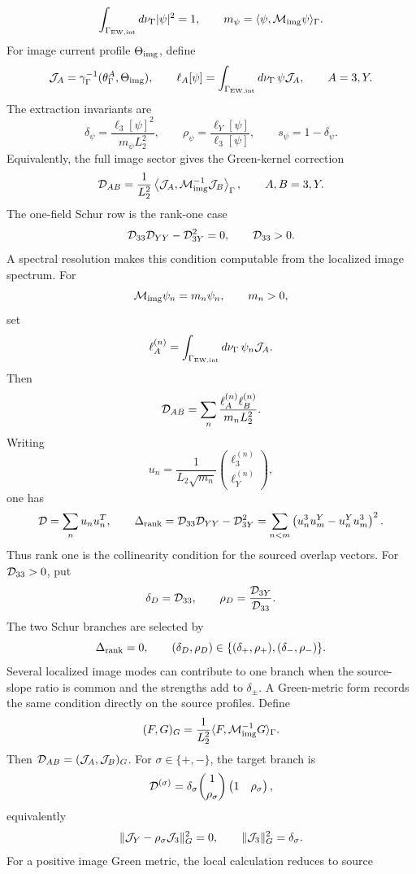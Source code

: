 \documentclass[11pt]{article}
\theoremstyle{definition}
\theoremstyle{remark}
\begin{document}
\[
  \int_{\Gamma_{\rm EW,int}}d\nu_\Gamma|\psi|^2=1,\qquad
  m_\psi=\langle\psi,{\cal M}_{\rm img}\psi\rangle_\Gamma .
\]
For image current profile \(\Theta_{\rm img}\), define
\[
  {\cal J}_A=\gamma_\Gamma^{-1}(\theta_\Gamma^A,\Theta_{\rm img}),
  \qquad
  \ell_A[\psi]=
  \int_{\Gamma_{\rm EW,int}}d\nu_\Gamma\,\psi{\cal J}_A,
  \qquad A=3,Y .
\]
The extraction invariants are
\[
  \delta_\psi=\frac{\ell_3[\psi]^2}{m_\psi L_2^2},
  \qquad
  \rho_\psi=\frac{\ell_Y[\psi]}{\ell_3[\psi]},
  \qquad
  s_\psi=1-\delta_\psi .
\]
Equivalently, the full image sector gives the Green-kernel correction
\[
  {\cal D}_{AB}
  =
  \frac{1}{L_2^2}
  \left\langle
  {\cal J}_A,
  {\cal M}_{\rm img}^{-1}{\cal J}_B
  \right\rangle_\Gamma,
  \qquad A,B=3,Y .
\]
The one-field Schur row is the rank-one case
\[
  {\cal D}_{33}{\cal D}_{YY}-{\cal D}_{3Y}^2=0,
  \qquad
  {\cal D}_{33}>0 .
\]
A spectral resolution makes this condition computable from the localized
image spectrum.  For
\[
  {\cal M}_{\rm img}\psi_n=m_n\psi_n,
  \qquad m_n>0,
\]
set
\[
  \ell_A^{(n)}
  =
  \int_{\Gamma_{\rm EW,int}}d\nu_\Gamma\,\psi_n{\cal J}_A .
\]
Then
\[
  {\cal D}_{AB}
  =
  \sum_n
  \frac{\ell_A^{(n)}\ell_B^{(n)}}{m_nL_2^2}.
\]
Writing
\[
  u_n
  =
  \frac{1}{L_2\sqrt{m_n}}
  \binom{\ell_3^{(n)}}{\ell_Y^{(n)}},
\]
one has
\[
  {\cal D}=\sum_n u_nu_n^T,
  \qquad
  \Delta_{\rm rank}
  =
  {\cal D}_{33}{\cal D}_{YY}-{\cal D}_{3Y}^2
  =
  \sum_{n<m}
  \left(u_n^3u_m^Y-u_n^Yu_m^3\right)^2 .
\]
Thus rank one is the collinearity condition for the sourced overlap vectors.
For \({\cal D}_{33}>0\), put
\[
  \delta_D={\cal D}_{33},
  \qquad
  \rho_D=\frac{{\cal D}_{3Y}}{{\cal D}_{33}} .
\]
The two Schur branches are selected by
\[
  \Delta_{\rm rank}=0,\qquad
  (\delta_D,\rho_D)
  \in
  \{(\delta_+,\rho_+),(\delta_-,\rho_-)\}.
\]
Several localized image modes can contribute to one branch when the
source-slope ratio is common and the strengths add to \(\delta_\pm\).
A Green-metric form records the same condition directly on the source
profiles.  Define
\[
  (F,G)_G
  =
  \frac{1}{L_2^2}
  \langle F,{\cal M}_{\rm img}^{-1}G\rangle_\Gamma .
\]
Then \({\cal D}_{AB}=({\cal J}_A,{\cal J}_B)_G\).  For
\(\sigma\in\{+,-\}\), the target branch is
\[
  {\cal D}^{(\sigma)}
  =
  \delta_\sigma
  \binom{1}{\rho_\sigma}
  \begin{pmatrix}1&\rho_\sigma\end{pmatrix},
\]
equivalently
\[
  \|{\cal J}_Y-\rho_\sigma{\cal J}_3\|_G^2=0,
  \qquad
  \|{\cal J}_3\|_G^2=\delta_\sigma .
\]
For a positive image Green metric, the local calculation reduces to source
\end{document}
